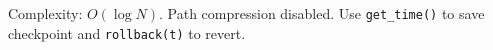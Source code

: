 
Complexity: $O(\log N)$. Path compression disabled. Use \lstinline|get_time()| to save checkpoint and \lstinline|rollback(t)| to revert.


